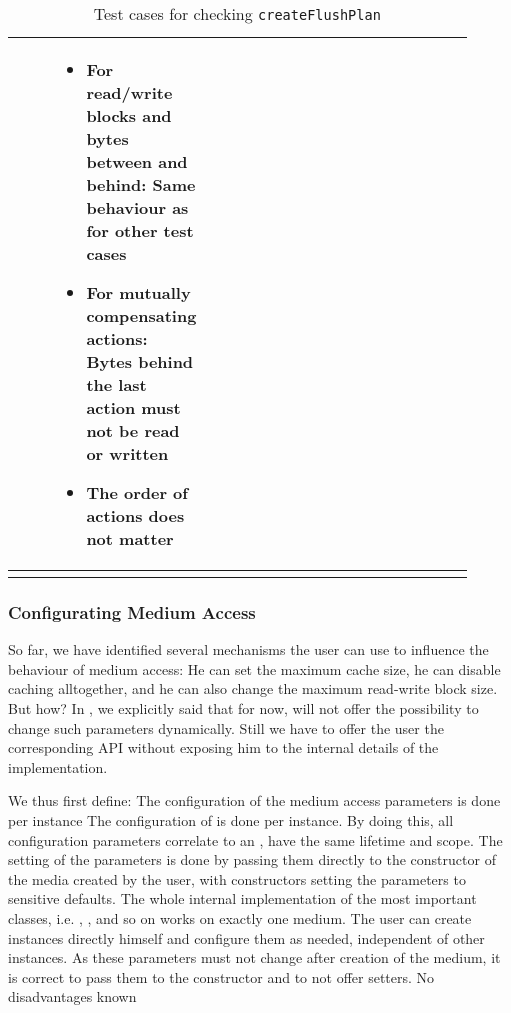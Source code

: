 \begin{landscape}
\begin{longtable}{|p{0.03\linewidth}|p{0.08\linewidth}|p{0.45\linewidth}|p{0.35\linewidth}|}
\begin{enumerate}
\end{enumerate}
&
\begin{itemize}
\item For read/write blocks and bytes between and behind: Same behaviour as for other test cases
\item For mutually compensating actions: Bytes behind the last action must not be read or written
\item The order of actions does not matter
\end{itemize}\\
\hline
\caption{Test cases for checking \texttt{createFlushPlan}}
\label{tab:createFlushPlan}
\end{longtable}
\end{landscape}

\subsubsection{Configurating Medium Access}%
\label{sec:Konfigurationsparameter}%

So far, we have identified several mechanisms the user can use to influence the behaviour of medium access: He can set the maximum cache size, he can disable caching alltogether, and he can also change the maximum read-write block size. But how? In , we explicitly said that for now, \LibName{} will not offer the possibility to change such parameters dynamically. Still we have to offer the user the corresponding API without exposing him to the internal details of the implementation.

We thus first define:
{%
The configuration of the medium access parameters is done per \IMedium{} instance
}
{%
The configuration of \COMPmedia{} is done per \IMedium{} instance. By doing this, all configuration parameters correlate to an \IMedium{}, have the same lifetime and scope. The setting of the parameters is done by passing them directly to the constructor of the media created by the user, with constructors setting the parameters to sensitive defaults.
}
{%
The whole internal implementation of the most important classes, i.e. \IMediumStore{}, \IMediumAccessor{}, \MediumCache{} and so on works on exactly one medium. The user can create \IMedium{} instances directly himself and configure them as needed, independent of other \IMedium{} instances. As these parameters must not change after creation of the medium, it is correct to pass them to the constructor and to not offer setters.
}
{%
No disadvantages known
}

